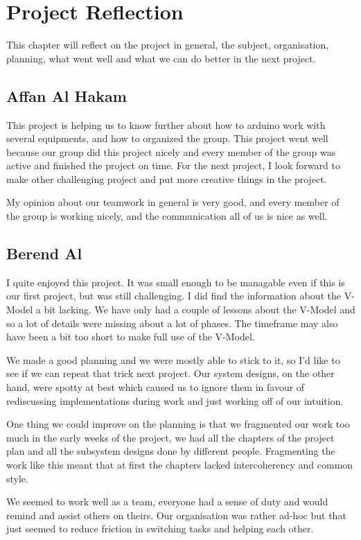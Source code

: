 \chapter{Project Reflection}
This chapter will reflect on the project in general, the subject, organisation, planning, what went well and what we can do better in the next project.

\section{Affan Al Hakam}
This project is helping us to know further about how to arduino work with several equipments, and how to organized the group.
 This project went well because our group did this project nicely and every member of the group was active and finished the project on time.
 For the next project, I look forward to make other challenging project and put more creative things in the project.

My opinion about our teamwork in general is very good, and every member of the group is working nicely, and the communication all of us is nice as well.

\section{Berend Al}
I quite enjoyed this project. It was small enough to be managable even if this is our first project, but was still challenging.
I did find the information about the V-Model a bit lacking.
We have only had a couple of lessons about the V-Model and so a lot of details were missing about a lot of phases.
The timeframe may also have been a bit too short to make full use of the V-Model.

We made a good planning and we were mostly able to stick to it, so I'd like to see if we can repeat that trick next project.
Our system designs, on the other hand, were spotty at best which caused us to ignore them in favour of rediscussing implementations during work and just working off of our intuition.

One thing we could improve on the planning is that we fragmented our work too much in the early weeks of the project, we had all the chapters of the project plan and all the subsystem designs done by different people.
Fragmenting the work like this meant that at first the chapters lacked intercoherency and common style.

We seemed to work well as a team, everyone had a sense of duty and would remind and assist others on theirs. Our organisation was rather ad-hoc but that just seemed to reduce friction in switching tasks and helping each other.

